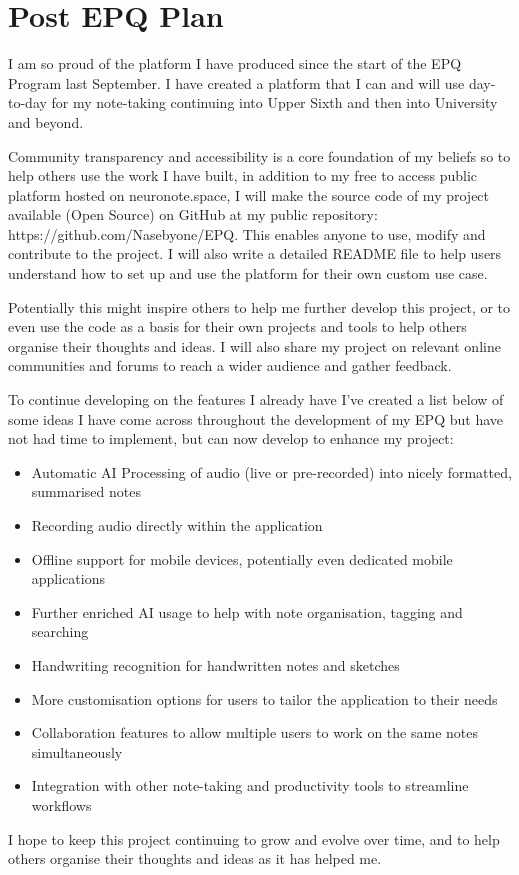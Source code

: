 \section{Post EPQ Plan}
\label{Planning:PostEPQPlan}
I am so proud of the platform I have produced since the start of the EPQ Program last September. I have created a platform that I can and will use day-to-day for my note-taking continuing into Upper Sixth and then into University and beyond. 

Community transparency and accessibility is a core foundation of my beliefs so to help others use the work I have built, in addition to my free to access public platform hosted on neuronote.space, I will make the source code of my project available (Open Source) on GitHub at my public repository: https://github.com/Nasebyone/EPQ. This enables anyone to use, modify and contribute to the project. I will also write a detailed README file to help users understand how to set up and use the platform for their own custom use case. 

Potentially this might inspire others to help me further develop this project, or to even use the code as a basis for their own projects and tools to help others organise their thoughts and ideas. I will also share my project on relevant online communities and forums to reach a wider audience and gather feedback.

To continue developing on the features I already have I've created a list below of some ideas I have come across throughout the development of my EPQ but have not had time to implement, but can now develop to enhance my project:

\begin{itemize}
    \item Automatic AI Processing of audio (live or pre-recorded) into nicely formatted, summarised notes
    \item Recording audio directly within the application
    \item Offline support for mobile devices, potentially even dedicated mobile applications
    \item Further enriched AI usage to help with note organisation, tagging and searching
    \item Handwriting recognition for handwritten notes and sketches
    \item More customisation options for users to tailor the application to their needs
    \item Collaboration features to allow multiple users to work on the same notes simultaneously
    \item Integration with other note-taking and productivity tools to streamline workflows
\end{itemize}

I hope to keep this project continuing to grow and evolve over time, and to help others organise their thoughts and ideas as it has helped me.